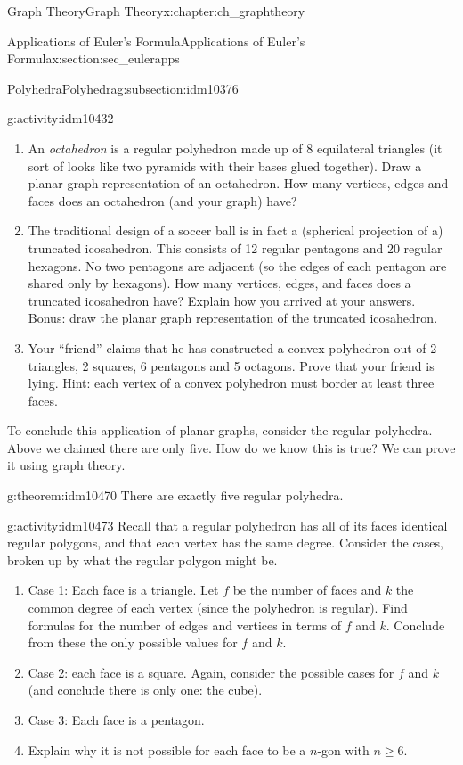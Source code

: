 \documentclass[oneside,10pt,]{book}
\numberwithin{equation}{chapter}
\begin{document}
\begin{chapterptx}{Graph Theory}{}{Graph Theory}{}{}{x:chapter:ch_graphtheory}
\begin{sectionptx}{Applications of Euler's Formula}{}{Applications of Euler's Formula}{}{}{x:section:sec_eulerapps}
\begin{subsectionptx}{Polyhedra}{}{Polyhedra}{}{}{g:subsection:idm10376}
\begin{activity}{}{g:activity:idm10432}
\begin{enumerate}[font=\bfseries,label=(\alph*),ref=\alph*]
\item{}An \emph{octahedron} is a regular polyhedron made up of 8 equilateral triangles (it sort of looks like two pyramids with their bases glued together). Draw a planar graph representation of an octahedron. How many vertices, edges and faces does an octahedron (and your graph) have?%
\item{}The traditional design of a soccer ball is in fact a (spherical projection of a) truncated icosahedron. This consists of 12 regular pentagons and 20 regular hexagons. No two pentagons are adjacent (so the edges of each pentagon are shared only by hexagons). How many vertices, edges, and faces does a truncated icosahedron have? Explain how you arrived at your answers. Bonus: draw the planar graph representation of the truncated icosahedron.%
\item{}Your ``friend'' claims that he has constructed a convex polyhedron out of 2 triangles, 2 squares, 6 pentagons and 5 octagons. Prove that your friend is lying. Hint: each vertex of a convex polyhedron must border at least three faces.%
\end{enumerate}
\end{activity}
To conclude this application of planar graphs, consider the regular polyhedra. Above we claimed there are only five. How do we know this is true? We can prove it using graph theory.%
\begin{theorem}{}{}{g:theorem:idm10470}%
There are exactly five regular polyhedra.%
\end{theorem}
\begin{activity}{}{g:activity:idm10473}%
Recall that a regular polyhedron has all of its faces identical regular polygons, and that each vertex has the same degree. Consider the cases, broken up by what the regular polygon might be.%
\begin{enumerate}[font=\bfseries,label=(\alph*),ref=\alph*]
\item{}Case 1: Each face is a triangle.  Let \(f\) be the number of faces and \(k\) the common degree of each vertex (since the polyhedron is regular).  Find formulas for the number of edges and vertices in terms of \(f\) and \(k\).  Conclude from these the only possible values for \(f\) and \(k\).%
\item{}Case 2: each face is a square.  Again, consider the possible cases for \(f\) and \(k\) (and conclude there is only one: the cube).%
\item{}Case 3: Each face is a pentagon.%
\item{}Explain why it is not possible for each face to be a \(n\)-gon with \(n \ge 6\).%

\end{enumerate}
\end{activity}
\end{subsectionptx}
\end{sectionptx}
\end{chapterptx}
\end{document}
